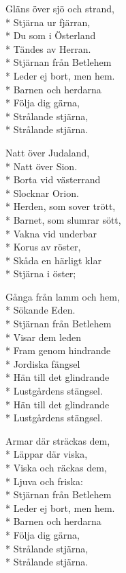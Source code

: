 \begin{SongText}
    \begin{SongVerse}
        Gläns över sjö och strand,\\*%
        Stjärna ur fjärran,\\*%
        Du som i Österland\\*%
        Tändes av Herran.\\*%
        Stjärnan från Betlehem\\*%
        Leder ej bort, men hem.\\*%
        Barnen och herdarna\\*%
        Följa dig gärna,\\*%
        Strålande stjärna,\\*%
        Strålande stjärna.
    \end{SongVerse}
    \begin{SongVerse}
        Natt över Judaland,\\*%
        Natt över Sion.\\*%
        Borta vid västerrand\\*%
        Slocknar Orion.\\*%
        Herden, som sover trött,\\*%
        Barnet, som slumrar sött,\\*%
        Vakna vid underbar\\*%
        Korus av röster,\\*%
        Skåda en härligt klar\\*%
        Stjärna i öster;
    \end{SongVerse}
    \begin{SongVerse}
        Gånga från lamm och hem,\\*%
        Sökande Eden.\\*%
        Stjärnan från Betlehem\\*%
        Visar dem leden\\*%
        Fram genom hindrande\\*%
        Jordiska fängsel\\*%
        Hän till det glindrande\\*%
        Lustgårdens stängsel.\\*%
        Hän till det glindrande\\*%
        Lustgårdens stängsel.
    \end{SongVerse}
    \begin{SongVerse}
        Armar där sträckas dem,\\*%
        Läppar där viska,\\*%
        Viska och räckas dem,\\*%
        Ljuva och friska:\\*%
        Stjärnan från Betlehem\\*%
        Leder ej bort, men hem.\\*%
        Barnen och herdarna\\*%
        Följa dig gärna,\\*%
        Strålande stjärna,\\*%
        Strålande stjärna.
    \end{SongVerse}
\end{SongText}
